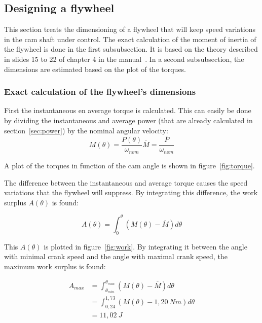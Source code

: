 \documentclass[a4paper]{article}
\begin{document}
\subsection{Designing a flywheel}

This section treats the dimensioning of a flywheel that will keep speed variations in the cam shaft under control. The exact calculation of the moment of inertia of the flywheel is done in the first subsubsection. It is based on the theory described in slides 15 to 22 of chapter 4 in the manual~\cite{cursus}. In a second subsubsection, the dimensions are estimated based on the plot of the torques.

\subsubsection{Exact calculation of the flywheel's dimensions}

First the instantaneous en average torque is calculated. This can easily be done by dividing the instantaneous and average power (that are already calculated in section~\ref{sec:power}) by the nominal angular velocity:
\begin{subequations}
\begin{equation}
	M(\theta)=\frac{P(\theta)}{\omega_{nom}}
\end{equation}
\begin{equation}
	\overline{M}=\frac{\overline{P}}{\omega_{nom}}
\end{equation}
\end{subequations}

A plot of the torques in function of the cam angle is shown in figure~\ref{fig:torque}. 

The difference between the instantaneous and average torque causes the speed variations that the flywheel will suppress. By integrating this difference, the work surplus \(A(\theta)\) is found:

\begin{equation}
	A(\theta)=\int_{0}^{\theta}(M(\theta)-\overline{M})d\theta
\end{equation}

This \(A(\theta)\) is plotted in figure~\ref{fig:work}. By integrating it between the angle with minimal crank speed and the angle with maximal crank speed, the maximum work surplus is found:

\begin{equation}
	\begin{split}
	A_{max}&=\int_{\theta_{min}}^{\theta_{max}}(M(\theta)-\overline{M})d\theta\\
	&=\int_{0,24}^{1,73}(M(\theta)-1,20~Nm)d\theta\\
	&=11,02~J
	\end{split}
	\label{eq:amax}
\end{equation}
\end{document}
